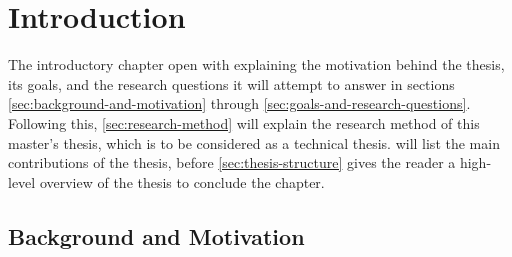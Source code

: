 \chapter{Introduction}
\label{cha:introduction}

\begin{comment}
All chapters should begin with an introduction before any sections, giving an overview of the chapter content.
Each section should in addition start with an introduction before its subsections begin.
Chapters with just one section --- or sections with just one sub-section --- should be avoided.
Think carefully about chapter and section titles as each title stands alone in the table of contents (without associated text)
and should convey the meaning of the contents of the chapter or section.

In all chapters and sections it is important to write clearly and concisely. Avoid repetitions and if needed refer back to the original discussion or presentation.
Each new section, subsection or paragraph should provide the reader with new information and be written in your own words. Avoid direct quotes.
If you use direct quotes, unless the quote itself is very significant, you are conveying to the reader that you are unable to express this discussion or fact yourself.
Such direct quotes also break the flow of the language (yours to someone else's).
\end{comment}

The introductory chapter open with explaining the motivation behind the thesis, its goals, and the research questions it will attempt to answer in sections \autoref{sec:background-and-motivation} through \autoref{sec:goals-and-research-questions}. Following this, \autoref{sec:research-method} will explain the research method of this master's thesis, which is to be considered as a technical thesis.  will list the main contributions of the thesis, before \autoref{sec:thesis-structure} gives the reader a high-level overview of the thesis to conclude the  chapter.

\section{Background and Motivation}
\label{sec:background-and-motivation}

